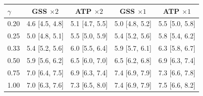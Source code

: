 \begin{tabular}{@{}lcccc@{}}
\toprule
$\gamma$ & GSS $\times2$ & ATP $\times2$ & GSS $\times1$ & ATP $\times1$ \\
\midrule
0.20 & 4.6 [4.5, 4.8] & 5.1 [4.7, 5.5] & 5.0 [4.8, 5.2] & 5.5 [5.0, 5.8] \\
0.25 & 5.0 [4.8, 5.1] & 5.5 [5.0, 5.9] & 5.4 [5.2, 5.6] & 5.8 [5.4, 6.2] \\
0.33 & 5.4 [5.2, 5.6] & 6.0 [5.5, 6.4] & 5.9 [5.7, 6.1] & 6.3 [5.8, 6.7] \\
0.50 & 5.9 [5.6, 6.2] & 6.5 [6.0, 7.0] & 6.5 [6.2, 6.8] & 6.9 [6.3, 7.4] \\
0.75 & 7.0 [6.4, 7.5] & 6.9 [6.3, 7.4] & 7.4 [6.9, 7.9] & 7.3 [6.6, 7.8] \\
1.00 & 7.0 [6.3, 7.6] & 7.3 [6.5, 8.0] & 7.4 [6.9, 7.9] & 7.5 [6.6, 8.2] \\
\bottomrule
\end{tabular}

